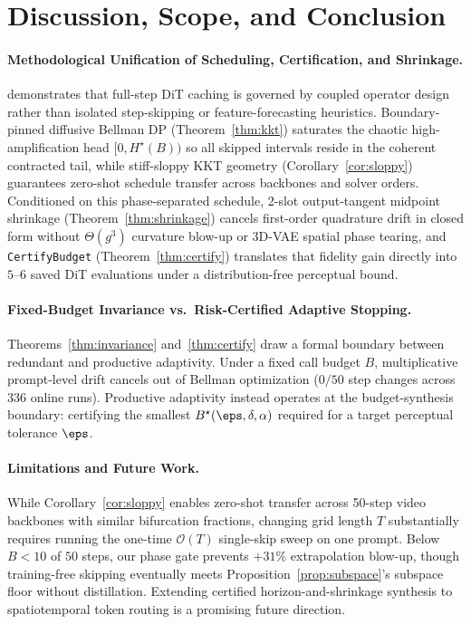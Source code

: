 \section{Discussion, Scope, and Conclusion}
\label{sec:discussion}

\paragraph{Methodological Unification of Scheduling, Certification, and Shrinkage.}
\method{} demonstrates that full-step DiT caching is governed by coupled operator design rather than isolated step-skipping or feature-forecasting heuristics. Boundary-pinned diffusive Bellman DP (Theorem~\ref{thm:kkt}) saturates the chaotic high-amplification head $[0, H^\star(B))$ so all skipped intervals reside in the coherent contracted tail, while stiff-sloppy KKT geometry (Corollary~\ref{cor:sloppy}) guarantees zero-shot schedule transfer across backbones and solver orders. Conditioned on this phase-separated schedule, 2-slot output-tangent midpoint shrinkage (Theorem~\ref{thm:shrinkage}) cancels first-order quadrature drift in closed form without $\Theta(g^3)$ curvature blow-up or 3D-VAE spatial phase tearing, and \texttt{CertifyBudget} (Theorem~\ref{thm:certify}) translates that fidelity gain directly into $5\text{--}6$ saved DiT evaluations under a distribution-free perceptual bound.

\paragraph{Fixed-Budget Invariance vs.\ Risk-Certified Adaptive Stopping.}
Theorems~\ref{thm:invariance} and~\ref{thm:certify} draw a formal boundary between redundant and productive adaptivity. Under a fixed call budget $B$, multiplicative prompt-level drift cancels out of Bellman optimization ($0/50$ step changes across 336 online runs). Productive adaptivity instead operates at the budget-synthesis boundary: certifying the smallest $B^\star(\eps, \delta, \alpha)$ required for a target perceptual tolerance $\eps$.

\paragraph{Limitations and Future Work.}
While Corollary~\ref{cor:sloppy} enables zero-shot transfer across 50-step video backbones with similar bifurcation fractions, changing grid length $T$ substantially requires running the one-time $\mathcal{O}(T)$ single-skip sweep on one prompt. Below $B < 10$ of $50$ steps, our phase gate prevents $+31\%$ extrapolation blow-up, though training-free skipping eventually meets Proposition~\ref{prop:subspace}'s subspace floor without distillation. Extending certified horizon-and-shrinkage synthesis to spatiotemporal token routing \citep{zou2024toca,feng2026worldcache} is a promising future direction.
